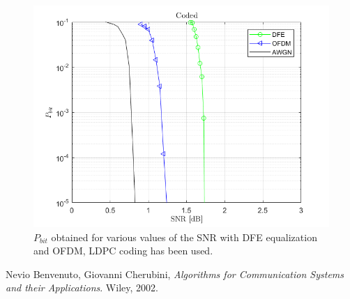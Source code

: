 \documentclass[a4paper,11.5pt]{article}
\begin{document}
\begin{figure}[H]
	\begin{center}   
		\includegraphics[width=\textwidth]{figs/Pbit_coded.png} 
		\caption{$P_{bit}$ obtained for various values of the SNR with DFE equalization and OFDM, LDPC coding has been used.}
		\label{fig:Pbit_coded}
	\end{center}
\end{figure}



 
\begin{thebibliography}{15}	
	Nevio Benvenuto, Giovanni Cherubini,
	\textit{Algorithms for Communication Systems and their Applications}. 
	Wiley, 2002.
\end{thebibliography}
\end{document}
